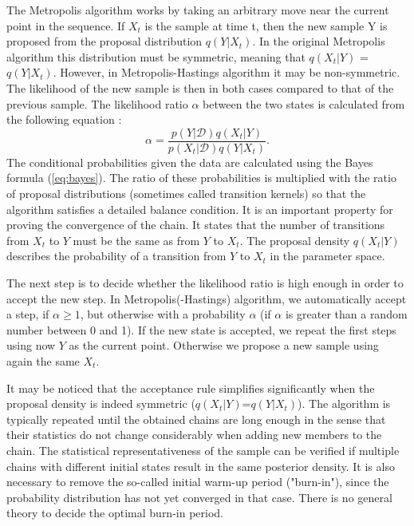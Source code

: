 \documentclass{wihuri}
\def\be{\begin{equation}}
\def\ee{\end{equation}}
\begin{document}
The Metropolis algorithm works by taking an arbitrary move near the current
point in the sequence. If $X_{t}$ is the sample at time t, then the new sample Y is proposed from the proposal distribution $q(Y|X_{t})$. In the original Metropolis algorithm this distribution must be symmetric, meaning that $q(X_{t}|Y)$ = $q(Y|X_{t})$. However, in Metropolis-Hastings algorithm it may be non-symmetric. The likelihood of the new sample is then in both cases compared to that of the previous sample. The likelihood ratio $\alpha$ between the two states is calculated from the following equation \cite{tuomi}:
\be \label{eq:likely_ratio} 
\alpha = \frac{p(Y|\mathcal{D})q(X_{t}|Y)}{p(X_{t}|\mathcal{D})q(Y|X_{t})}.
\ee
The conditional probabilities given the data are calculated using the Bayes formula (\ref{eq:bayes}). The ratio of these probabilities is multiplied with the ratio of proposal distributions (sometimes called transition kernels) so that the algorithm satisfies a detailed balance condition. It is an important property for proving the convergence of the chain. It states that the number of transitions from $X_{t}$ to $Y$ must be the same as from $Y$ to $X_{t}$.  The proposal density $q(X_{t}|Y)$ describes the probability of a transition from $Y$ to $X_{t}$ in the parameter space.

The next step is to decide whether the likelihood ratio is high enough in order to accept the new step. In Metropolis(-Hastings) algorithm, we automatically accept a step, if $\alpha \ge 1$, but otherwise with a probability $\alpha$ (if $\alpha$ is greater than a random number between 0 and 1). If the new state is accepted, we repeat the first steps using now $Y$ as the current point. Otherwise we propose a new sample using again the same $X_{t}$. 



It may be noticed that the acceptance rule simplifies significantly when the
proposal density is indeed symmetric ($q(X_{t}|Y)$=$q(Y|X_{t})$). The algorithm is typically repeated until the obtained chains are long enough in the sense that their statistics do not change considerably when adding new members to the chain. The statistical representativeness of the sample can be verified
if multiple chains with different initial states result in the same posterior density. It is also necessary to remove the so-called initial warm-up period ("burn-in"), %
since the probability distribution has not yet converged in that case. %
There is no general theory to decide the optimal burn-in period.%
\end{document}
